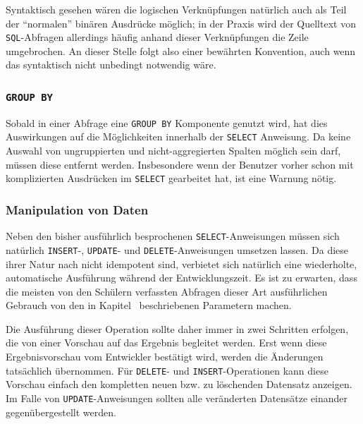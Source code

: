 Syntaktisch gesehen wären die logischen Verknüpfungen natürlich auch als Teil der "`normalen"' binären Ausdrücke möglich; in der Praxis wird der Quelltext von \texttt{SQL}-Abfragen allerdings häufig anhand dieser Verknüpfungen die Zeile umgebrochen. An dieser Stelle folgt \idename{} also einer bewährten Konvention, auch wenn das syntaktisch nicht unbedingt notwendig wäre.

\subsubsection{\texttt{GROUP BY}}

Sobald in einer Abfrage eine \texttt{GROUP BY} Komponente genutzt wird, hat dies Auswirkungen auf die Möglichkeiten innerhalb der \texttt{SELECT} Anweisung. Da keine Auswahl von ungruppierten und nicht-aggregierten Spalten möglich sein darf, müssen diese entfernt werden. Insbesondere wenn der Benutzer vorher schon mit komplizierten Ausdrücken im \texttt{SELECT} gearbeitet hat, ist eine Warnung nötig.

\subsubsection{Manipulation von Daten}

Neben den bisher ausführlich besprochenen \texttt{SELECT}-Anweisungen müssen sich natürlich \texttt{INSERT}-, \texttt{UPDATE}- und \texttt{DELETE}-Anweisungen umsetzen lassen. Da diese ihrer Natur nach nicht idempotent sind, verbietet sich natürlich eine wiederholte, automatische Ausführung während der Entwicklungszeit. Es ist zu erwarten, dass die meisten von den Schülern verfassten Abfragen dieser Art ausführlichen Gebrauch von den in Kapitel~ beschriebenen Parametern machen.

Die Ausführung dieser Operation sollte daher immer in zwei Schritten erfolgen, die von einer Vorschau auf das Ergebnis begleitet werden. Erst wenn diese Ergebnisvorschau vom Entwickler bestätigt wird, werden die Änderungen tatsächlich übernommen. Für \texttt{DELETE}- und \texttt{INSERT}-Operationen kann diese Vorschau einfach den kompletten neuen bzw. zu löschenden Datensatz anzeigen. Im Falle von \texttt{UPDATE}-Anweisungen sollten alle veränderten Datensätze einander gegenübergestellt werden.

